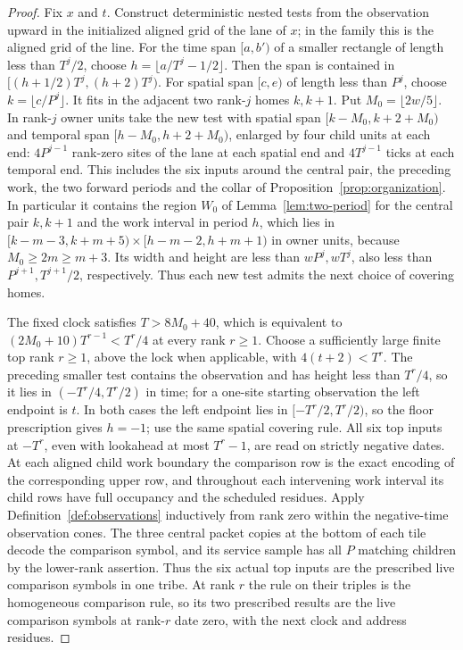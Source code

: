 \begin{proof}
Fix \(x\) and \(t\). Construct deterministic nested tests from the observation upward in the initialized aligned grid of the lane of \(x\); in the family this is the aligned grid of the line. For the time span \([a,b')\) of a smaller rectangle of length less than \(T^j/2\), choose \(h=\lfloor a/T^j-1/2\rfloor\). Then the span is contained in \([(h+1/2)T^j,(h+2)T^j)\). For spatial span \([c,e)\) of length less than \(P^j\), choose \(k=\lfloor c/P^j\rfloor\). It fits in the adjacent two rank-\(j\) homes \(k,k+1\). Put \(M_0=\lfloor2w/5\rfloor\). In rank-\(j\) owner units take the new test with spatial span \([k-M_0,k+2+M_0)\) and temporal span \([h-M_0,h+2+M_0)\), enlarged by four child units at each end: \(4P^{j-1}\) rank-zero sites of the lane at each spatial end and \(4T^{j-1}\) ticks at each temporal end. This includes the six inputs around the central pair, the preceding work, the two forward periods and the collar of Proposition~\ref{prop:organization}. In particular it contains the region \(W_0\) of Lemma~\ref{lem:two-period} for the central pair \(k,k+1\) and the work interval in period \(h\), which lies in \([k-m-3,k+m+5)\times[h-m-2,h+m+1)\) in owner units, because \(M_0\ge2m\ge m+3\). Its width and height are less than \(wP^j,wT^j\), also less than \(P^{j+1},T^{j+1}/2\), respectively. Thus each new test admits the next choice of covering homes.

The fixed clock satisfies \(T>8M_0+40\), which is equivalent to \((2M_0+10)T^{r-1}<T^r/4\) at every rank \(r\ge1\). Choose a sufficiently large finite top rank \(r\ge1\), above the lock when applicable, with \(4(t+2)<T^r\). The preceding smaller test contains the observation and has height less than \(T^r/4\), so it lies in \((-T^r/4,T^r/2)\) in time; for a one-site starting observation the left endpoint is \(t\). In both cases the left endpoint lies in \([-T^r/2,T^r/2)\), so the floor prescription gives \(h=-1\); use the same spatial covering rule. All six top inputs at \(-T^r\), even with lookahead at most \(T^r-1\), are read on strictly negative dates. At each aligned child work boundary the comparison row is the exact encoding of the corresponding upper row, and throughout each intervening work interval its child rows have full occupancy and the scheduled residues. Apply Definition~\ref{def:observations} inductively from rank zero within the negative-time observation cones. The three central packet copies at the bottom of each tile decode the comparison symbol, and its service sample has all \(P\) matching children by the lower-rank assertion. Thus the six actual top inputs are the prescribed live comparison symbols in one tribe. At rank \(r\) the rule on their triples is the homogeneous comparison rule, so its two prescribed results are the live comparison symbols at rank-\(r\) date zero, with the next clock and address residues.


\end{proof}
